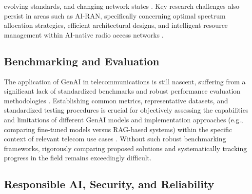 \documentclass[sigconf]{acmart}
\begin{document}
evolving standards, and changing network states \cite{ref17, ref25}. Key research challenges also persist in areas such as AI-RAN, specifically concerning optimal spectrum allocation strategies, efficient architectural designs, and intelligent resource management within AI-native radio access networks \cite{ref34}.

\subsection{Benchmarking and Evaluation}
\label{sec:benchmarking}

The application of GenAI in telecommunications is still nascent, suffering from a significant lack of standardized benchmarks and robust performance evaluation methodologies \cite{ref18}. Establishing common metrics, representative datasets, and standardized testing procedures is crucial for objectively assessing the capabilities and limitations of different GenAI models and implementation approaches (e.g., comparing fine-tuned models versus RAG-based systems) within the specific context of relevant telecom use cases \cite{ref18}. Without such robust benchmarking frameworks, rigorously comparing proposed solutions and systematically tracking progress in the field remains exceedingly difficult.

\subsection{Responsible AI, Security, and Reliability}
\label{sec:responsible_ai_security}
\end{document}
